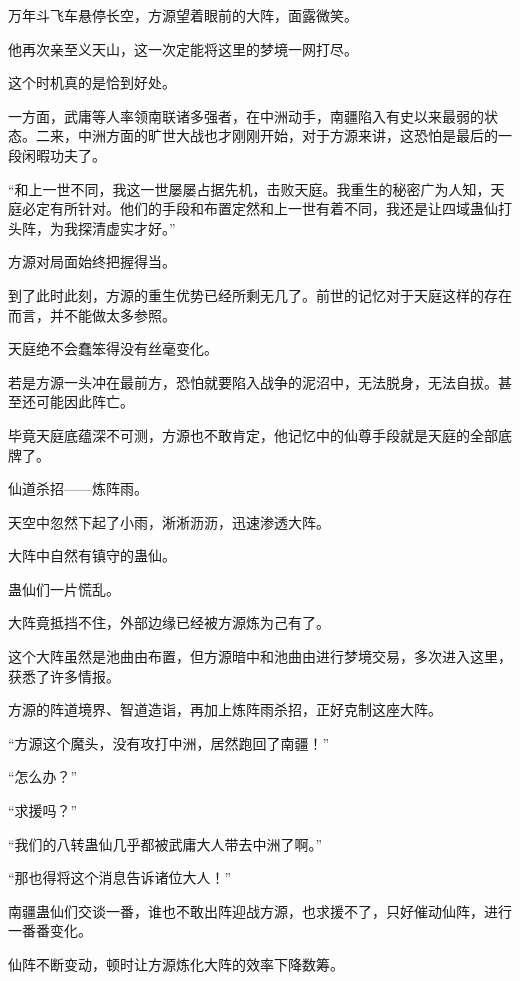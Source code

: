 
\begin{this_body}



万年斗飞车悬停长空，方源望着眼前的大阵，面露微笑。

他再次亲至义天山，这一次定能将这里的梦境一网打尽。

这个时机真的是恰到好处。

一方面，武庸等人率领南联诸多强者，在中洲动手，南疆陷入有史以来最弱的状态。二来，中洲方面的旷世大战也才刚刚开始，对于方源来讲，这恐怕是最后的一段闲暇功夫了。

“和上一世不同，我这一世屡屡占据先机，击败天庭。我重生的秘密广为人知，天庭必定有所针对。他们的手段和布置定然和上一世有着不同，我还是让四域蛊仙打头阵，为我探清虚实才好。”

方源对局面始终把握得当。

到了此时此刻，方源的重生优势已经所剩无几了。前世的记忆对于天庭这样的存在而言，并不能做太多参照。

天庭绝不会蠢笨得没有丝毫变化。

若是方源一头冲在最前方，恐怕就要陷入战争的泥沼中，无法脱身，无法自拔。甚至还可能因此阵亡。

毕竟天庭底蕴深不可测，方源也不敢肯定，他记忆中的仙尊手段就是天庭的全部底牌了。

仙道杀招——炼阵雨。

天空中忽然下起了小雨，淅淅沥沥，迅速渗透大阵。

大阵中自然有镇守的蛊仙。

蛊仙们一片慌乱。

大阵竟抵挡不住，外部边缘已经被方源炼为己有了。

这个大阵虽然是池曲由布置，但方源暗中和池曲由进行梦境交易，多次进入这里，获悉了许多情报。

方源的阵道境界、智道造诣，再加上炼阵雨杀招，正好克制这座大阵。

“方源这个魔头，没有攻打中洲，居然跑回了南疆！”

“怎么办？”

“求援吗？”

“我们的八转蛊仙几乎都被武庸大人带去中洲了啊。”

“那也得将这个消息告诉诸位大人！”

南疆蛊仙们交谈一番，谁也不敢出阵迎战方源，也求援不了，只好催动仙阵，进行一番番变化。

仙阵不断变动，顿时让方源炼化大阵的效率下降数筹。


\end{this_body}

